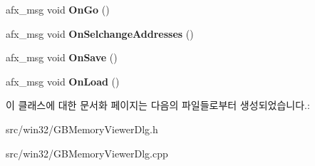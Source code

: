 \begin{DoxyCompactItemize}
afx\+\_\+msg void {\bfseries On\+Go} ()
\item 
\mbox{\label{class_g_b_memory_viewer_dlg_a4e089b7216a76ba514f26f061f53fd8c}} 
afx\+\_\+msg void {\bfseries On\+Selchange\+Addresses} ()
\item 
\mbox{\label{class_g_b_memory_viewer_dlg_abea90b70d9579272367ed561fe796b01}} 
afx\+\_\+msg void {\bfseries On\+Save} ()
\item 
\mbox{\label{class_g_b_memory_viewer_dlg_ac81a1ae7e069e1db594879cddbd7b6d8}} 
afx\+\_\+msg void {\bfseries On\+Load} ()
\end{DoxyCompactItemize}


이 클래스에 대한 문서화 페이지는 다음의 파일들로부터 생성되었습니다.\+:\begin{DoxyCompactItemize}
\item 
src/win32/G\+B\+Memory\+Viewer\+Dlg.\+h\item 
src/win32/G\+B\+Memory\+Viewer\+Dlg.\+cpp\end{DoxyCompactItemize}
